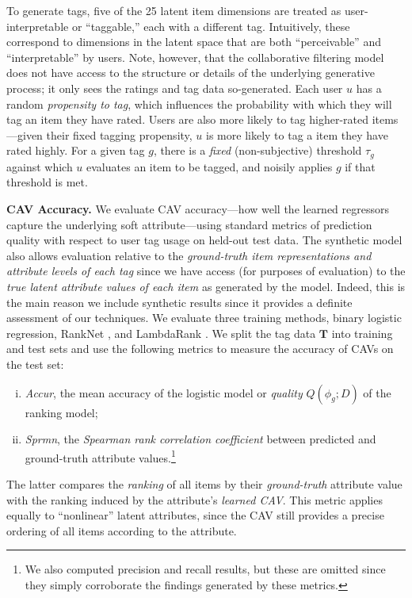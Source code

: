 \documentclass[manuscript,screen,nonacm]{acmart}
\newcommand{\1}{{\mathbf 1}}
\newcommand{\bfT}{\mathbf{T}}
\theoremstyle{TheoremNum}
\begin{document}
To generate tags, five of the 25 latent item dimensions are treated as user-interpretable or ``taggable,'' each with a different tag.
Intuitively, these correspond to dimensions in the latent space that are both ``perceivable'' and ``interpretable'' by users.
Note, however, that the collaborative filtering model does not have access to the structure or details of the underlying generative process; it only sees the ratings and tag data so-generated.
Each user $u$ has a random \emph{propensity to tag}, which influences the probability with which they will tag an item they have rated.
Users are also more likely to tag higher-rated items---given their fixed tagging propensity, $u$ is more likely to tag a item they have rated highly. For a given tag $g$, there is a \emph{fixed} (non-subjective) threshold $\tau_g$ against which $u$ evaluates an item to be tagged, and noisily applies $g$ if that threshold is met.





\vskip 2mm
\noindent
\textbf{CAV Accuracy.} \hspace*{2mm}
We evaluate CAV accuracy---how well the learned regressors capture the underlying soft attribute---using standard metrics of prediction quality with respect to user tag usage on held-out test data. The synthetic model also allows evaluation relative to the \emph{ground-truth item representations and attribute levels of each tag} since we have access (for purposes of evaluation) to the \emph{true latent attribute values of each item} as generated by the model. Indeed, this is the main reason we include synthetic results since it provides a definite assessment of our techniques.
We evaluate three training methods, binary logistic regression, RankNet \cite{RankNet2005}, and LambdaRank \cite{burges2010ranknet}.
We split the tag data $\bfT$ into training and test sets and 
use the following metrics to measure the accuracy of CAVs on the test set:
\begin{enumerate}[(i)]
\item \emph{Accur}, the mean accuracy of the logistic model or \emph{quality} $Q(\phi_g; D)$ of the ranking model; 
\item \emph{Sprmn}, the \emph{Spearman rank correlation coefficient} between predicted and ground-truth attribute values.\footnote{We also computed precision and recall results, but these are omitted since they simply corroborate the findings generated by these metrics.}
\end{enumerate}
The latter compares the \emph{ranking} of all items by their \emph{ground-truth} attribute value with the ranking induced by the attribute's \emph{learned CAV}.
This metric applies equally to ``nonlinear'' latent attributes, since the CAV still provides a precise ordering of all items according to the attribute.
\end{document}
